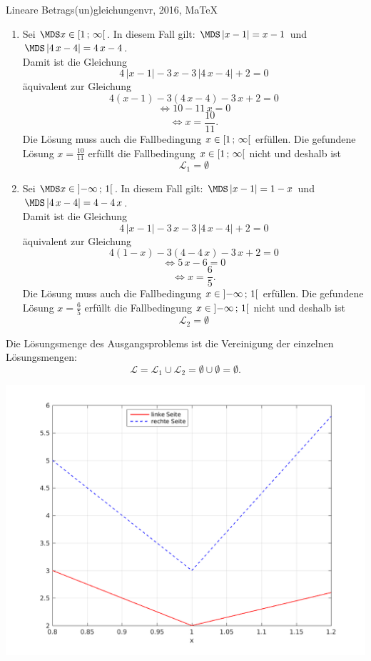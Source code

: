 \begin{MAufgabe}{Lineare Betrags(un)gleichungen}{vr, 2016, MaTeX}
 \begin{enumerate} 
 \item Sei $ \MDS x\in[ 1 \, \MIntvlSep \, \infty\MoIr $. 
 In diesem Fall gilt: 
  $ \MDS \left| x - 1\right|=x - 1$ und $ \MDS \left| 4\, x - 4\right|=4\, x - 4$. \\ 
 Damit ist die Gleichung 
 $$ 
4\, \left|x - 1\right| - 3\, x - 3\, \left|4\, x - 4\right| + 2= 0
$$
 \"aquivalent zur Gleichung
 $$ 
4\left(x - 1\right)-3\left( 4\, x - 4\right)- 3\, x+2= 0 
$$  
$$ 
 \Leftrightarrow 10 - 11\, x= 0 
$$  
$$ \Leftrightarrow x = \frac{10}{11} . 
 $$ 
 Die L\"osung muss auch die Fallbedingung $x\in [ 1 \, ; \, \infty[\mbox{}  $ erf\"ullen. Die gefundene L\"osung $x=\frac{10}{11}$ erf\"ullt die Fallbedingung  $x\in [ 1 \, ; \, \infty[\mbox{} $ nicht und deshalb ist  $$
 \mathcal{L}_{1}=\emptyset 
 $$ 
\item Sei $ \MDS x\in\MoIl  -\infty \, \MIntvlSep \, 1\MoIr $. 
 In diesem Fall gilt: 
  $ \MDS \left| x - 1\right|=1 - x$ und $ \MDS \left| 4\, x - 4\right|=4 - 4\, x$. \\ 
 Damit ist die Gleichung 
 $$ 
4\, \left|x - 1\right| - 3\, x - 3\, \left|4\, x - 4\right| + 2= 0
$$
 \"aquivalent zur Gleichung
 $$ 
4\left(1 - x\right)-3\left( 4 - 4\, x\right)- 3\, x+2= 0 
$$  
$$ 
 \Leftrightarrow 5\, x - 6= 0 
$$  
$$ \Leftrightarrow x = \frac{6}{5} . 
 $$ 
 Die L\"osung muss auch die Fallbedingung $x\in \mbox{}]\mathopen{}  -\infty \, ; \, 1[\mbox{}  $ erf\"ullen. Die gefundene L\"osung $x=\frac{6}{5}$ erf\"ullt die Fallbedingung  $x\in \mbox{}]\mathopen{}  -\infty \, ; \, 1[\mbox{} $ nicht und deshalb ist  $$
 \mathcal{L}_{2}=\emptyset 
 $$ 
 \end{enumerate} 
  Die L\"osungsmenge des Ausgangsproblems ist die Vereinigung der einzelnen L\"osungsmengen: 
$$ \mathcal{L} = \mathcal{L}_{1} \cup \mathcal{L}_{2} 
 = \emptyset\cup \emptyset 
   =\emptyset 
   . $$ 
 
 \begin{center}
 \includegraphics[width=0.8\linewidth]{Abb_zur_Ag_autogenerated_ineq_3.png} \end{center}
 
\else\relax\fi
 \end{MAufgabe}